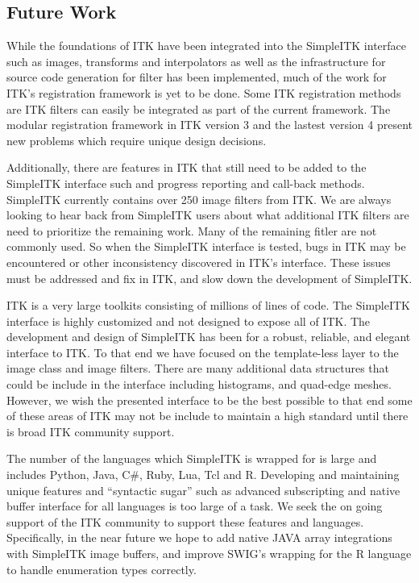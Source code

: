 \documentclass{frontiersMED} %
\begin{document}
\subsection{Future Work}
While the foundations of ITK have been integrated into the SimpleITK
interface such as images, transforms and interpolators as well as the
infrastructure for source code generation for filter has been
implemented, much of the work for ITK’s registration framework is yet
to be done. Some ITK registration methods are ITK filters can easily
be integrated as part of the current framework. The modular
registration framework in ITK version 3 and the lastest version 4
present new problems which require unique design decisions.

Additionally, there are features in ITK that still need to be added to
the SimpleITK interface such and progress reporting and call-back
methods. SimpleITK currently contains over 250 image filters from
ITK. We are always looking to hear back from SimpleITK users about
what additional ITK filters are need to prioritize the remaining
work. Many of the remaining fitler are not commonly used. So when the
SimpleITK interface is tested, bugs in ITK may be encountered or other
inconsistency discovered in ITK’s interface. These issues must be
addressed and fix in ITK, and slow down the development of SimpleITK.

ITK is a very large toolkits consisting of millions of lines of
code. The SimpleITK interface is highly customized and not designed to
expose all of ITK. The development and design of SimpleITK has been
for a robust, reliable, and elegant interface to ITK. To that end we
have focused on the template-less layer to the image class and image
filters.  There are many additional data structures that could be
include in the interface including histograms, and quad-edge
meshes. However, we wish the presented interface to be the best
possible to that end some of these areas of ITK may not be include to
maintain a high standard until there is broad ITK community support.

The number of the languages which SimpleITK is wrapped for is large
and includes Python, Java, C\#, Ruby, Lua, Tcl and R. Developing and
maintaining unique features and “syntactic sugar” such as advanced
subscripting and native buffer interface for all languages is too
large of a task. We seek the on going support of the ITK community to
support these features and languages. Specifically, in the near future
we hope to add native JAVA array integrations with SimpleITK image
buffers, and improve SWIG’s wrapping for the R language to handle
enumeration types correctly.
\end{document}
